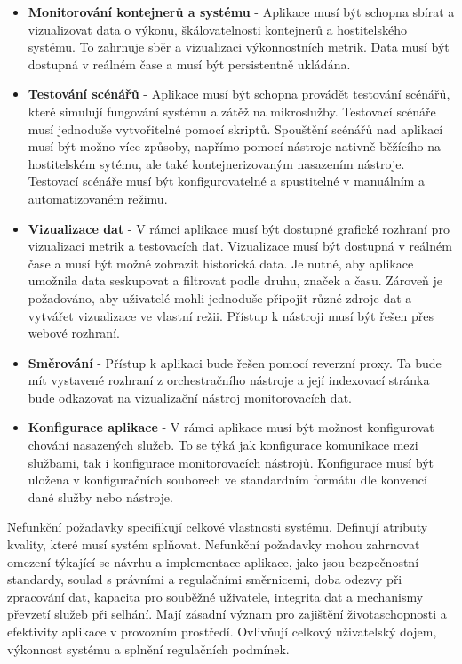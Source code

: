 \begin{itemize}
  \item \textbf{Monitorování kontejnerů a systému} - Aplikace musí být schopna sbírat a vizualizovat data o výkonu, škálovatelnosti kontejnerů a hostitelského systému. To zahrnuje sběr a vizualizaci výkonnostních metrik. Data musí být dostupná v reálném čase a musí být persistentně ukládána.
  \item \textbf{Testování scénářů} - Aplikace musí být schopna provádět testování scénářů, které simulují fungování systému a zátěž na mikroslužby. Testovací scénáře musí jednoduše vytvořitelné pomocí skriptů. Spouštění scénářů nad aplikací musí být možno více způsoby, napřímo pomocí nástroje nativně běžícího na hostitelském sytému, ale také kontejnerizovaným nasazením nástroje. Testovací scénáře musí být konfigurovatelné a spustitelné v manuálním a automatizovaném režimu. 
  \item \textbf{Vizualizace dat} - V rámci aplikace musí být dostupné grafické rozhraní pro vizualizaci metrik a testovacích dat. Vizualizace musí být dostupná v reálném čase a musí být možné zobrazit historická data. Je nutné, aby aplikace umožnila data seskupovat a filtrovat podle druhu, značek a času. Zároveň je požadováno, aby uživatelé mohli jednoduše připojit různé zdroje dat a vytvářet vizualizace ve vlastní režii. Přístup k nástroji musí být řešen přes webové rozhraní.
  \item \textbf{Směrování} - Přístup k aplikaci bude řešen pomocí reverzní proxy. Ta bude mít vystavené rozhraní z orchestračního nástroje a její indexovací stránka bude odkazovat na vizualizační nástroj monitorovacích dat.
  \item \textbf{Konfigurace aplikace} - V rámci aplikace musí být možnost konfigurovat chování nasazených služeb. To se týká jak konfigurace komunikace mezi službami, tak i konfigurace monitorovacích nástrojů. Konfigurace musí být uložena v konfiguračních souborech ve standardním formátu dle konvencí dané služby nebo nástroje.
\end{itemize}


Nefunkční požadavky specifikují celkové vlastnosti systému. Definují atributy kvality, které musí systém splňovat. Nefunkční požadavky mohou zahrnovat omezení týkající se návrhu a implementace aplikace, jako jsou bezpečnostní standardy, soulad s právními a regulačními směrnicemi, doba odezvy při zpracování dat, kapacita pro souběžné uživatele, integrita dat a mechanismy převzetí služeb při selhání. Mají zásadní význam pro zajištění životaschopnosti a efektivity aplikace v provozním prostředí. Ovlivňují celkový uživatelský dojem, výkonnost systému a splnění regulačních podmínek.

